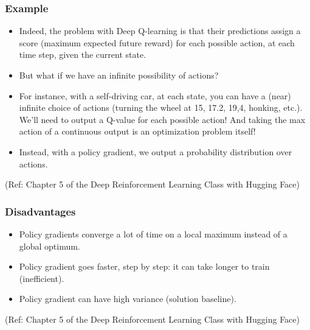 \begin{frame}[fragile]\frametitle{Example  }

\begin{itemize}
\item Indeed, the problem with Deep Q-learning is that their predictions assign a score (maximum expected future reward) for each possible action, at each time step, given the current state.

\item But what if we have an infinite possibility of actions?

\item For instance, with a self-driving car, at each state, you can have a (near) infinite choice of actions (turning the wheel at 15, 17.2, 19,4, honking, etc.). We'll need to output a Q-value for each possible action! And taking the max action of a continuous output is an optimization problem itself!

\item Instead, with a policy gradient, we output a probability distribution over actions.
\end{itemize}

{\tiny (Ref: Chapter 5 of the Deep Reinforcement Learning Class with Hugging Face)}

\end{frame}

\begin{frame}[fragile]\frametitle{Disadvantages   }

\begin{itemize}
\item Policy gradients converge a lot of time on a local maximum instead of a global optimum.
\item Policy gradient goes faster, step by step: it can take longer to train (inefficient).
\item Policy gradient can have high variance (solution baseline).
\end{itemize}

{\tiny (Ref: Chapter 5 of the Deep Reinforcement Learning Class with Hugging Face)}

\end{frame}


